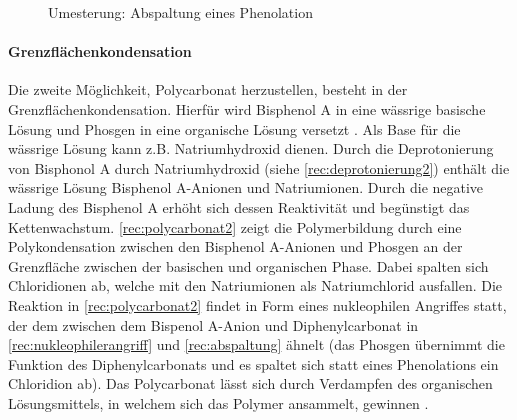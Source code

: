 \begin{figure}[H]
    \begin{center}
        \footnotesize
        \setatomsep{1.7em}


        \vspace{10pt}

        \chemrel{->}
        \chemnameinit{}
        \chemsign{+}

        \caption{Umesterung: Abspaltung eines Phenolation}
        \label{rec:abspaltung}
    \end{center}
\end{figure}

\paragraph{Grenzflächenkondensation} Die zweite Möglichkeit, Polycarbonat
herzustellen, besteht in der Grenzflächenkondensation. Hierfür wird Bisphenol A
in eine wässrige basische Lösung und Phosgen in eine organische Lösung versetzt
\cite{cuzpe}. Als Base für die wässrige Lösung kann z.B. Natriumhydroxid dienen.
Durch die Deprotonierung von Bisphonol A durch Natriumhydroxid (siehe
\autoref{rec:deprotonierung2}) enthält die wässrige Lösung Bisphenol A-Anionen
und Natriumionen. Durch die negative Ladung des Bisphenol A erhöht sich dessen
Reaktivität und begünstigt das Kettenwachstum. \autoref{rec:polycarbonat2} zeigt
die Polymerbildung durch eine Polykondensation zwischen den Bisphenol A-Anionen
und Phosgen an der Grenzfläche zwischen der basischen und organischen Phase.
Dabei spalten sich Chloridionen ab, welche mit den Natriumionen als
Natriumchlorid ausfallen. Die Reaktion in \autoref{rec:polycarbonat2} findet in
Form eines nukleophilen Angriffes statt, der dem zwischen dem Bispenol A-Anion
und Diphenylcarbonat in \autoref{rec:nukleophilerangriff} und
\autoref{rec:abspaltung} ähnelt (das Phosgen übernimmt die Funktion des
Diphenylcarbonats und es spaltet sich statt eines Phenolations ein Chloridion
ab). Das Polycarbonat lässt sich durch Verdampfen des organischen
Lösungsmittels, in welchem sich das Polymer ansammelt, gewinnen \cite{garoo}.

